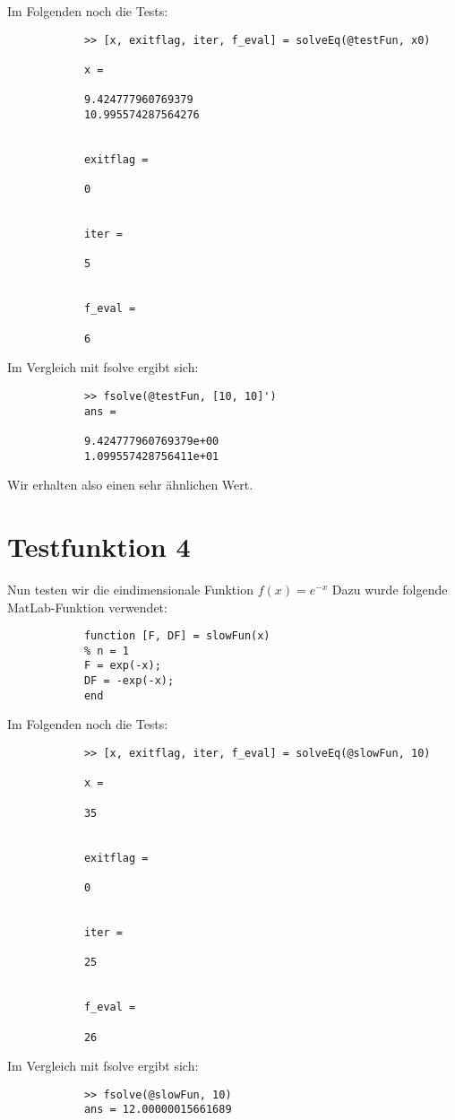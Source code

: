 \documentclass[11pt,titlepage]{article}
\begin{document}
		Im Folgenden noch die Tests:
		
		\begin{lstlisting}
			>> [x, exitflag, iter, f_eval] = solveEq(@testFun, x0)
			
			x =
			
			9.424777960769379
			10.995574287564276
			
			
			exitflag =
			
			0
			
			
			iter =
			
			5
			
			
			f_eval =
			
			6
		\end{lstlisting}
		
		Im Vergleich mit fsolve ergibt sich:
		
		\begin{lstlisting}
			>> fsolve(@testFun, [10, 10]')
			ans =
			
			9.424777960769379e+00   
			1.099557428756411e+01
		\end{lstlisting}
	
		Wir erhalten also einen sehr ähnlichen Wert.
	
	\section{Testfunktion 4}
		Nun testen wir die eindimensionale Funktion $ f(x) = e^{-x}$
		Dazu wurde folgende MatLab-Funktion verwendet:
		\begin{lstlisting}
			function [F, DF] = slowFun(x)
			% n = 1  
			F = exp(-x);
			DF = -exp(-x);
			end
		\end{lstlisting}
	
		Im Folgenden noch die Tests:
		
		\begin{lstlisting}
			>> [x, exitflag, iter, f_eval] = solveEq(@slowFun, 10)
			
			x =
			
			35
			
			
			exitflag =
			
			0
			
			
			iter =
			
			25
			
			
			f_eval =
			
			26
		\end{lstlisting}
		
		Im Vergleich mit fsolve ergibt sich:
		
		\begin{lstlisting}
			>> fsolve(@slowFun, 10)
			ans = 12.00000015661689
		\end{lstlisting}
	
\end{document}
